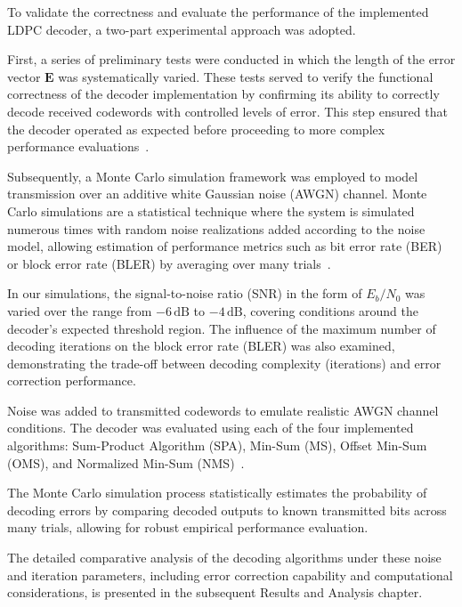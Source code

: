 \documentclass[../main.tex]{subfiles}
\begin{document}
To validate the correctness and evaluate the performance of the implemented LDPC decoder, a two-part experimental approach was adopted.

First, a series of preliminary tests were conducted in which the length of the error vector \(\mathbf{E}\) was systematically varied. These tests served to verify the functional correctness of the decoder implementation by confirming its ability to correctly decode received codewords with controlled levels of error. This step ensured that the decoder operated as expected before proceeding to more complex performance evaluations~\cite{Liva2012, Fossorier2004}.

Subsequently, a Monte Carlo simulation framework was employed to model transmission over an additive white Gaussian noise (AWGN) channel. Monte Carlo simulations are a statistical technique where the system is simulated numerous times with random noise realizations added according to the noise model, allowing estimation of performance metrics such as bit error rate (BER) or block error rate (BLER) by averaging over many trials~\cite{Proakis2001, Kim2015}. 

In our simulations, the signal-to-noise ratio (SNR) in the form of \(E_b/N_0\) was varied over the range from \(-6\, \mathrm{dB}\) to \(-4\, \mathrm{dB}\), covering conditions around the decoder's expected threshold region. The influence of the maximum number of decoding iterations on the block error rate (BLER)   was also examined, demonstrating the trade-off between decoding complexity (iterations) and error correction performance.

Noise was added to transmitted codewords to emulate realistic AWGN channel conditions. The decoder was evaluated using each of the four implemented algorithms: Sum-Product Algorithm (SPA), Min-Sum (MS), Offset Min-Sum (OMS), and Normalized Min-Sum (NMS)~\cite{Ryan2009, Richardson2001}.

The Monte Carlo simulation process statistically estimates the probability of decoding errors by comparing decoded outputs to known transmitted bits across many trials, allowing for robust empirical performance evaluation.

The detailed comparative analysis of the decoding algorithms under these noise and iteration parameters, including error correction capability and computational considerations, is presented in the subsequent Results and Analysis chapter.

\end{document}
